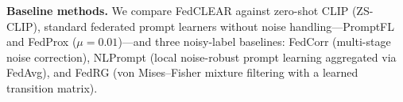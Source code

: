 \documentclass[runningheads]{llncs}
\begin{document}
\textbf{Baseline methods.} We compare FedCLEAR against zero-shot CLIP (ZS-CLIP), standard federated prompt learners without noise handling—PromptFL \cite{guo2023promptfl} and FedProx \cite{li2020fedprox} ($\mu = 0.01$)—and three noisy-label baselines: FedCorr \cite{xu2022fedcorr} (multi-stage noise correction), NLPrompt \cite{pan2025nlprompt} (local noise-robust prompt learning aggregated via FedAvg), and FedRG \cite{wen2026fedrg} (von Mises--Fisher mixture filtering with a learned transition matrix).
\FloatBarrier
\end{document}
